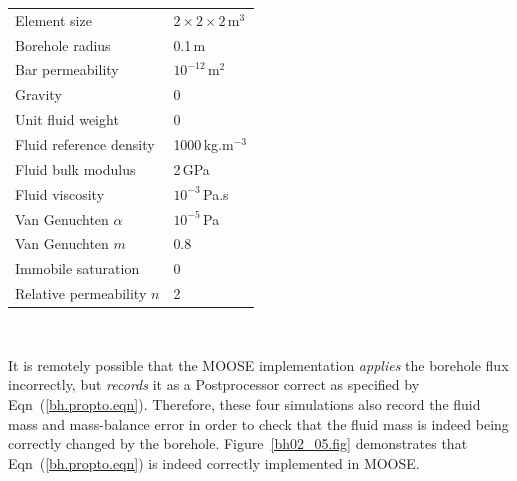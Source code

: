 \documentclass[]{scrreprt}
\begin{document}
\begin{center}
\begin{tabular}{|ll|}
\hline
Element size & $2\times 2\times 2$\,m$^{3}$ \\
Borehole radius & 0.1\,m \\
Bar permeability & $10^{-12}$\,m$^{2}$ \\
Gravity & 0 \\
Unit fluid weight & 0 \\
Fluid reference density & 1000\,kg.m$^{-3}$ \\
Fluid bulk modulus & 2\,GPa \\
Fluid viscosity & $10^{-3}$\,Pa.s \\
Van Genuchten $\alpha$ & $10^{-5}$\,Pa \\
Van Genuchten $m$ & 0.8  \\
Immobile saturation & 0 \\
Relative permeability $n$ & 2 \\
\hline
\end{tabular} \\
\end{center}
It is remotely possible that the MOOSE implementation {\em applies}
the borehole flux incorrectly, but {\em records} it as a Postprocessor
correct as specified by Eqn~(\ref{bh.propto.eqn}).  Therefore, these
four simulations also record the fluid mass and mass-balance error in
order to check that the fluid mass is indeed being correctly changed
by the borehole.  Figure~\ref{bh02_05.fig} demonstrates that
Eqn~(\ref{bh.propto.eqn}) is indeed correctly implemented in MOOSE.
\end{document}
